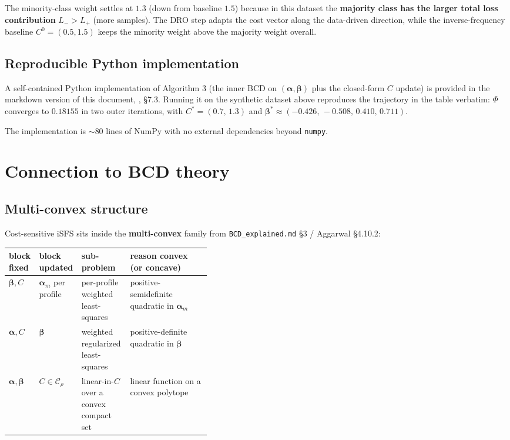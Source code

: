 \documentclass[11pt,a4paper]{article}
\begin{document}
The minority-class weight settles at $1.3$ (down from baseline $1.5$) because in this dataset the \textbf{majority class has the larger total loss contribution} $L_- > L_+$ (more samples). The DRO step adapts the cost vector along the data-driven direction, while the inverse-frequency baseline $C^0 = (0.5, 1.5)$ keeps the minority weight above the majority weight overall.

\subsection{Reproducible Python implementation}

A self-contained Python implementation of Algorithm 3 (the inner BCD on $(\boldsymbol{\alpha}, \boldsymbol{\beta})$ plus the closed-form $C$ update) is provided in the markdown version of this document, , \S 7.3. Running it on the synthetic dataset above reproduces the trajectory in the table verbatim: $\Phi$ converges to $0.18155$ in two outer iterations, with $C^{*} = (0.7,\,1.3)$ and $\boldsymbol{\beta}^{*} \approx (-0.426,\,-0.508,\,0.410,\,0.711)$.

The implementation is $\sim$80 lines of NumPy with no external dependencies beyond \texttt{numpy}.

\section{Connection to BCD theory}

\subsection{Multi-convex structure}

Cost-sensitive iSFS sits inside the \textbf{multi-convex} family from \texttt{BCD\_explained.md} \S 3 / Aggarwal \S 4.10.2:

\begin{center}
\begin{tabular}{lllp{0.40\linewidth}}
\toprule
\textbf{block fixed} & \textbf{block updated} & \textbf{sub-problem} & \textbf{reason convex (or concave)} \\
\midrule
$\boldsymbol{\beta}, C$ & $\boldsymbol{\alpha}_m$ per profile & per-profile weighted least-squares & positive-semidefinite quadratic in $\boldsymbol{\alpha}_m$ \\
$\boldsymbol{\alpha}, C$ & $\boldsymbol{\beta}$ & weighted regularized least-squares & positive-definite quadratic in $\boldsymbol{\beta}$ \\
$\boldsymbol{\alpha}, \boldsymbol{\beta}$ & $C \in \mathcal{C}_\rho$ & linear-in-$C$ over a convex compact set & linear function on a convex polytope \\
\bottomrule
\end{tabular}
\end{center}
\end{document}
